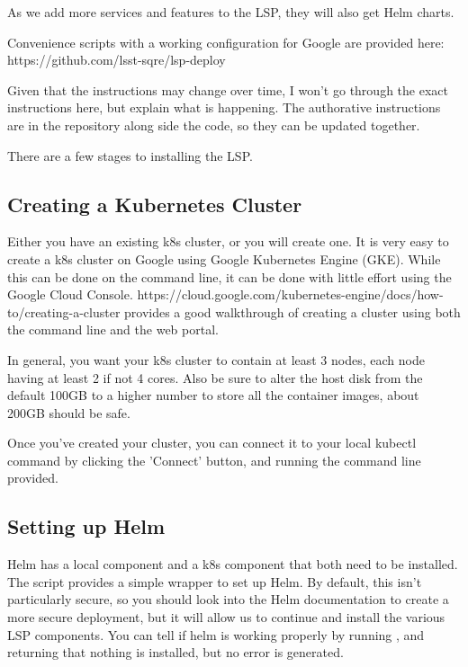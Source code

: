 \documentclass[11pt,twoside]{article}
\begin{document}
As we add more services and features to the LSP, they will also get Helm charts.

Convenience scripts with a working configuration for Google are provided here:
https://github.com/lsst-sqre/lsp-deploy

Given that the instructions may change over time, I won't go through the exact
instructions here, but explain what is happening.  The authorative instructions
are in the repository along side the code, so they can be updated together.

There are a few stages to installing the LSP.

\subsection{Creating a Kubernetes Cluster}

Either you have an existing k8s cluster, or you will create one.  It is very
easy to create a k8s cluster on Google using Google Kubernetes Engine (GKE).
While this can be done on the command line, it can be done with little effort
using the Google Cloud Console.  https://cloud.google.com/kubernetes-engine/docs/how-to/creating-a-cluster provides a good walkthrough of creating a cluster using both the command line
and the web portal.

In general, you want your k8s cluster to contain at least 3 nodes, each node
having at least 2 if not 4 cores.  Also be sure to alter the host disk from
the default 100GB to a higher number to store all the container images, about
200GB should be safe.

Once you've created your cluster, you can connect it to your local kubectl
command by clicking the 'Connect' button, and running the command line provided.

\subsection{Setting up Helm}

Helm has a local component and a k8s component that both need to be installed.
The  script provides a simple wrapper to set up Helm.
By default, this isn't particularly secure, so you should look into the Helm
documentation to create a more secure deployment, but it will allow us to
continue and install the various LSP components.  You can tell if helm is
working properly by running , and returning that nothing
is installed, but no error is generated.
\end{document}
